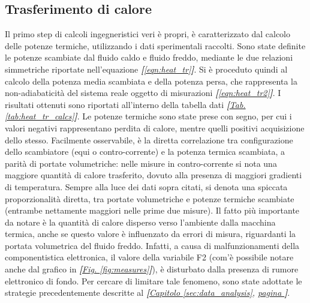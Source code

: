 \documentclass[a4paper,10pt]{article}                                                                                       %
\begin{document}
\subsection{Trasferimento di calore}                                                                                        %
\label{subsec:heat_tr}                                                                                                      %
  Il primo step di calcoli ingegneristici veri è propri, è caratterizzato dal calcolo delle potenze termiche, utilizzando i
  dati sperimentali raccolti. Sono state definite le potenze scambiate dal fluido caldo e fluido freddo, mediante le
  due relazioni simmetriche riportate nell'equazione \textit{\textbf{[}\ref{eqn:heat_tr}\textbf{]}}. Si è proceduto quindi
  al calcolo della potenza media scambiata e della potenza persa, che rappresenta la non-adiabaticità del
  sistema reale oggetto di misurazioni \textit{\textbf{[}\ref{eqn:heat_tr2}\textbf{]}}. I risultati ottenuti sono riportati
  all'interno della tabella dati \textit{\textbf{[}\hyperref[tab:heat_tr_calcs]{Tab. }\ref{tab:heat_tr_calcs}\textbf{]}}.
  Le potenze termiche sono state prese con segno, per cui i valori negativi rappresentano perdita di calore, mentre quelli
  positivi acquisizione dello stesso. Facilmente osservabile, è la diretta correlazione tra configurazione dello
  scambiatore (equi o contro-corrente) e la potenza termica scambiata, a parità di portate volumetriche: nelle misure in
  contro-corrente si nota una maggiore quantità di calore trasferito, dovuto alla presenza di maggiori gradienti di
  temperatura. Sempre alla luce dei dati sopra citati, si denota una spiccata proporzionalità diretta, tra portate
  volumetriche e potenze termiche scambiate (entrambe nettamente maggiori nelle prime due misure). Il fatto più importante
  da notare è la quantità di calore disperso verso l'ambiente dalla macchina termica, anche se questo valore è influenzato
  da errori di misura, riguardanti la portata volumetrica del fluido freddo. Infatti, a causa di malfunzionamenti della
  componentistica elettronica, il valore della variabile F2 (com'è possibile notare anche dal grafico in
  \textit{\textbf{[}\hyperref[fig:measures]{Fig. }\ref{fig:measures}\textbf{]}}), è disturbato dalla presenza
  di rumore elettronico di fondo. Per cercare di limitare tale fenomeno, sono state adottate le strategie precedentemente
  descritte al \textit{\textbf{[}\hyperref[sec:data_analysis]{Capitolo }\ref{sec:data_analysis},
  \hyperref[sec:data_analysis]{pagina }\pageref{sec:data_analysis}\textbf{]}}.
  \clearpage                                                                                                                %
\end{document}
